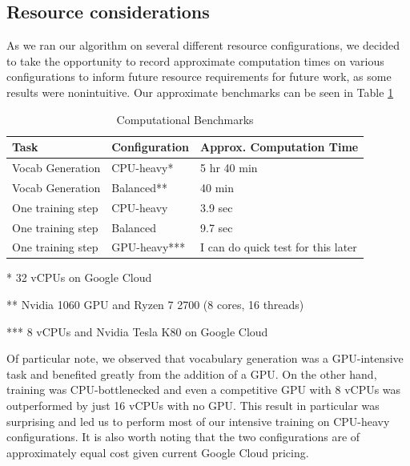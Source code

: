 \documentclass[11pt]{article}
\begin{document}
\subsection{Resource considerations}

As we ran our algorithm on several different resource configurations, we decided to take the opportunity to record approximate computation times on various configurations to inform future resource requirements for future work, as some results were nonintuitive. Our approximate benchmarks can be seen in Table \ref{table:2}

\begin{table}[h!]
\begin{threeparttable}
\centering
\begin{tabular}{|p{2cm}|p{2.2cm}|p{2cm}|} 
 \hline
 Task & Configuration & Approx. Computation Time \\ [0.5ex] 
 \hline
 Vocab Generation & CPU-heavy* & 5 hr 40 min \\ 
 Vocab Generation & Balanced** & 40 min \\
 One training step & CPU-heavy & 3.9 sec \\
 One training step & Balanced & 9.7 sec \\ 
 One training step & GPU-heavy*** & I can do quick test for this later \\[1ex]
 \hline
\end{tabular}
\begin{tablenotes}\footnotesize
\item[*] 32 vCPUs on Google Cloud
\item[**] Nvidia 1060 GPU and Ryzen 7 2700 (8 cores, 16 threads)
\item[***] 8 vCPUs and Nvidia Tesla K80 on Google Cloud
\end{tablenotes}
\caption{Computational Benchmarks}
\end{threeparttable}
\label{table:2}
\end{table}

Of particular note, we observed that vocabulary generation was a GPU-intensive task and benefited greatly from the addition of a GPU. On the other hand, training was CPU-bottlenecked and even a competitive GPU with 8 vCPUs was outperformed by just 16 vCPUs with no GPU. This result in particular was surprising and led us to perform most of our intensive training on CPU-heavy configurations. It is also worth noting that the two configurations are of approximately equal cost given current Google Cloud pricing.
\end{document}
